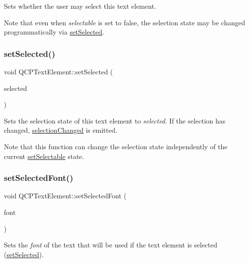 Sets whether the user may select this text element.

Note that even when {\itshape selectable} is set to {\ttfamily false}, the selection state may be changed programmatically via \hyperlink{classQCPTextElement_aba5521f9fb22a5f3d2f09ab37d4a1751}{set\+Selected}. \mbox{\label{classQCPTextElement_aba5521f9fb22a5f3d2f09ab37d4a1751}} 
\subsubsection{\texorpdfstring{set\+Selected()}{setSelected()}}
{\footnotesize\ttfamily void Q\+C\+P\+Text\+Element\+::set\+Selected (\begin{DoxyParamCaption}\item[{bool}]{selected }\end{DoxyParamCaption})}

Sets the selection state of this text element to {\itshape selected}. If the selection has changed, \hyperlink{classQCPTextElement_a49f45b87ee9c1fe866c2cdd12af17a9a}{selection\+Changed} is emitted.

Note that this function can change the selection state independently of the current \hyperlink{classQCPTextElement_a3c5f9b1897a036b16495ed3fb8371c55}{set\+Selectable} state. \mbox{\label{classQCPTextElement_a0a2397a3c4ede519e16ab3e991904065}} 
\subsubsection{\texorpdfstring{set\+Selected\+Font()}{setSelectedFont()}}
{\footnotesize\ttfamily void Q\+C\+P\+Text\+Element\+::set\+Selected\+Font (\begin{DoxyParamCaption}\item[{const Q\+Font \&}]{font }\end{DoxyParamCaption})}

Sets the {\itshape font} of the text that will be used if the text element is selected (\hyperlink{classQCPTextElement_aba5521f9fb22a5f3d2f09ab37d4a1751}{set\+Selected}).

